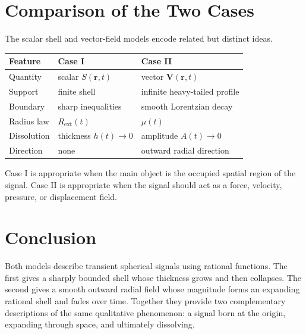 \documentclass[a4paper,12pt]{article}
\begin{document}
\section{Comparison of the Two Cases}

The scalar shell and vector-field models encode related but distinct ideas.

\begin{center}
\begin{tabular}{lll}
\hline
Feature & Case I & Case II \\
\hline
Quantity & scalar \(S(\bm{r},t)\) & vector \(\bm{V}(\bm{r},t)\) \\
Support & finite shell & infinite heavy-tailed profile \\
Boundary & sharp inequalities & smooth Lorentzian decay \\
Radius law & \(R_{\mathrm{ext}}(t)\) & \(\mu(t)\) \\
Dissolution & thickness \(h(t)\to 0\) & amplitude \(A(t)\to 0\) \\
Direction & none & outward radial direction \\
\hline
\end{tabular}
\end{center}

Case I is appropriate when the main object is the occupied spatial region of
the signal. Case II is appropriate when the signal should act as a force,
velocity, pressure, or displacement field.

\section{Conclusion}

Both models describe transient spherical signals using rational functions. The
first gives a sharply bounded shell whose thickness grows and then collapses.
The second gives a smooth outward radial field whose magnitude forms an
expanding rational shell and fades over time. Together they provide two
complementary descriptions of the same qualitative phenomenon: a signal born at
the origin, expanding through space, and ultimately dissolving.
\end{document}
